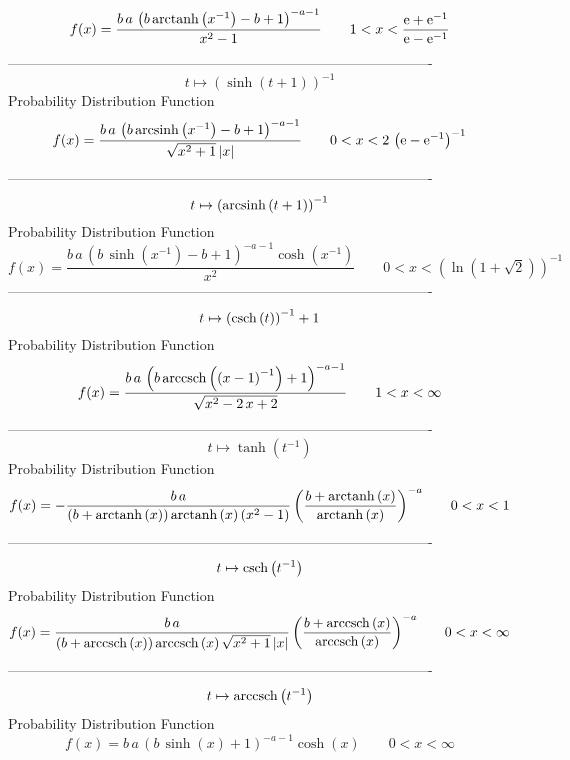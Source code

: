 \documentclass[12pt]{article}
\begin{document}
$$  f(x)={\frac {b\,a\, \left( b\,{\rm arctanh} \left({x}^{-1}\right)-b+1
 \right) ^{-a-1}}{{x}^{2}-1}}
 \qquad1
 < x < {\frac {{\rm e}+{{\rm e}^{-1}}}{{\rm e}-{{\rm e}^{-1}}}}
$$-------------------------------------------------------------------------------------------  \\$$t\mapsto  \left( \sinh \left( t+1 \right)  \right) ^{-1}
$$Probability Distribution Function 
$$  f(x)={\frac {b\,a\, \left( b\,{\rm arcsinh} \left({x}^{-1}\right)-b+1
 \right) ^{-a-1}}{\sqrt {{x}^{2}+1} \left| x \right| }}
 \qquad0
 < x < 2\, \left( {\rm e}-{{\rm e}^{-1}} \right) ^{-1}
$$-------------------------------------------------------------------------------------------  \\$$t\mapsto  \left( {\rm arcsinh} \left(t+1\right) \right) ^{-1}
$$Probability Distribution Function 
$$  f(x)={\frac {b\,a\, \left( b\,\sinh \left( {x}^{-1} \right) -b+1 \right) ^{
-a-1}\cosh \left( {x}^{-1} \right) }{{x}^{2}}}
 \qquad0
 < x <  \left( \ln  \left( 1+\sqrt {2} \right)  \right) ^{-1}
$$-------------------------------------------------------------------------------------------  \\$$t\mapsto  \left( {\rm csch} \left(t\right) \right) ^{-1}+1
$$Probability Distribution Function 
$$  f(x)={\frac {b\,a\, \left( b\,{\rm arccsch} \left( \left( x-1 \right) ^{-1}
\right)+1 \right) ^{-a-1}}{\sqrt {{x}^{2}-2\,x+2}}}
 \qquad1
 < x < \infty 
$$-------------------------------------------------------------------------------------------  \\$$t\mapsto \tanh \left( {t}^{-1} \right) 
$$Probability Distribution Function 
$$  f(x)=-{\frac {b\,a}{ \left( b+{\rm arctanh} \left(x\right) \right) 
{\rm arctanh} \left(x\right) \left( {x}^{2}-1 \right) } \left( {\frac 
{b+{\rm arctanh} \left(x\right)}{{\rm arctanh} \left(x\right)}}
 \right) ^{-a}}
 \qquad0
 < x < 1
$$-------------------------------------------------------------------------------------------  \\$$t\mapsto {\rm csch} \left({t}^{-1}\right)
$$Probability Distribution Function 
$$  f(x)={\frac {b\,a}{ \left( b+{\rm arccsch} \left(x\right) \right) 
{\rm arccsch} \left(x\right)\sqrt {{x}^{2}+1} \left| x \right| }
 \left( {\frac {b+{\rm arccsch} \left(x\right)}{{\rm arccsch} \left(x
\right)}} \right) ^{-a}}
 \qquad0
 < x < \infty 
$$-------------------------------------------------------------------------------------------  \\$$t\mapsto {\rm arccsch} \left({t}^{-1}\right)
$$Probability Distribution Function 
$$  f(x)=b\,a\, \left( b\,\sinh \left( x \right) +1 \right) ^{-a-1}\cosh
 \left( x \right) 
 \qquad0
 < x < \infty 
$$
\end{document}
